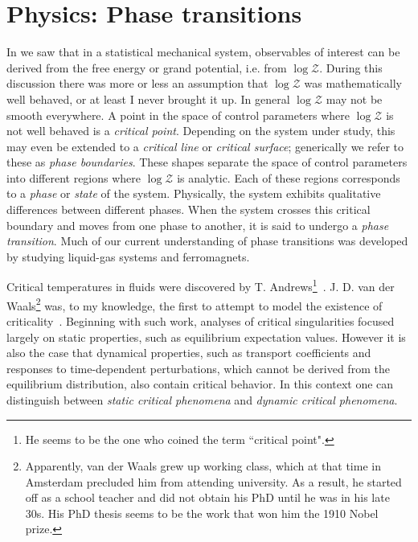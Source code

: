 \chapter{Physics: Phase transitions}

In  we saw that in a statistical mechanical system,
observables of interest can be derived from the free energy or grand potential,
i.e. from $\log\mathcal{Z}$. During this discussion there was more or less an
assumption that $\log\mathcal{Z}$ was mathematically well behaved, or at least
I never brought it up. In general $\log\mathcal{Z}$ may not be smooth
everywhere. A point in the space of control parameters where $\log\mathcal{Z}$
is not well behaved is a {\it critical point}. Depending
on the system under study, this may even be extended to a {\it critical line} or
{\it critical surface}; generically we refer to these as {\it phase
boundaries}. These shapes separate the space of control parameters
into different regions where $\log\mathcal{Z}$ is analytic. Each of these
regions corresponds to a {\it phase} or {\it state} of
the system. Physically, the system exhibits qualitative differences between
different phases. When the system crosses this critical boundary and moves from
one phase to another, it is said to undergo a {\it phase transition}.
Much of our current understanding of phase transitions was developed by studying
liquid-gas systems and ferromagnets. 

Critical temperatures in fluids were discovered by T. 
Andrews\footnote{He seems to be the one who coined the
term ``critical point".}~\cite{andrews_bakerian_1869}.
J. D. van der Waals\footnote{Apparently, van der Waals grew up working
class, which at that time in Amsterdam precluded him from attending
university. As a result, he started off as a school teacher and did not
obtain his PhD until he was in his late 30s. His PhD thesis seems to be
the work that won him the 1910 Nobel prize.}
was, to my knowledge, the first to attempt to
model the existence of criticality~\cite{van_der_waals_over_1873}.
Beginning with such work, analyses of critical singularities 
focused largely on static properties, such as equilibrium
expectation values. However it is also the case that dynamical properties,
such as transport coefficients and responses to time-dependent perturbations,
which cannot be derived from the equilibrium distribution, also contain
critical behavior. In this context one can distinguish between
{\it static critical phenomena} and {\it dynamic critical phenomena}.


